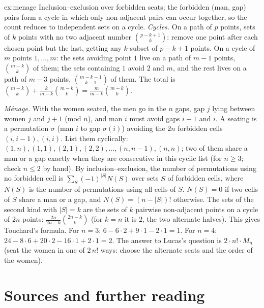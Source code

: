 \begin{solution}{ex:menage}
\idea Inclusion--exclusion over forbidden seats; the forbidden (man, gap) pairs form a cycle in which only non-adjacent pairs can
occur together, so the count reduces to independent sets on a cycle.
\writeup \emph{Cycles.} On a path of $p$ points, sets of $k$ points with no two adjacent number $\binom{p-k+1}k$: remove one point after each chosen
point but the last, getting any $k$-subset of $p-k+1$ points. On a cycle of $m$ points $1,\dots,m$: the sets avoiding point $1$ live on a
path of $m-1$ points, $\binom{m-k}k$ of them; the sets containing $1$ avoid $2$ and $m$, and the rest lives on a path of $m-3$ points, $\binom{m-k-1}{k-1}$ of them.
The total is $\binom{m-k}k+\frac k{m-k}\binom{m-k}k=\frac m{m-k}\binom{m-k}k$.

\emph{M\'enage.} With the women seated, the men go in the $n$ gaps, gap $j$ lying between women $j$ and $j+1$ (mod $n$), and man $i$ must avoid
gaps $i-1$ and $i$. A seating is a permutation $\sigma$ (man $i$ to gap $\sigma(i)$) avoiding the $2n$ forbidden cells $(i,i-1),(i,i)$. List them cyclically:
$(1,n),(1,1),(2,1),(2,2),\dots,(n,n-1),(n,n)$; two of them share a man or a gap exactly when they are consecutive in this cyclic list (for
$n\ge3$; check $n\le2$ by hand). By inclusion--exclusion, the number of permutations using no forbidden cell is $\sum_S(-1)^{|S|}N(S)$ over
sets $S$ of forbidden cells, where $N(S)$ is the number of permutations using all cells of $S$. $N(S)=0$ if two cells of $S$ share a man or a
gap, and $N(S)=(n-|S|)!$ otherwise. The sets of the second kind with $|S|=k$ are the sets of $k$ pairwise non-adjacent points on a cycle of
$2n$ points: $\frac{2n}{2n-k}\binom{2n-k}k$ (for $k=n$ it is $2$, the two alternate halves). This gives Touchard's formula. For $n=3$:
$6-6\cdot2+9\cdot1-2\cdot1=1$. For $n=4$: $24-8\cdot6+20\cdot2-16\cdot1+2\cdot1=2$. The answer to Lucas's question is $2\cdot n!\cdot M_n$ (seat the women in one of
$2\,n!$ ways: choose the alternate seats and the order of the women).
\end{solution}

\section*{Sources and further reading}

